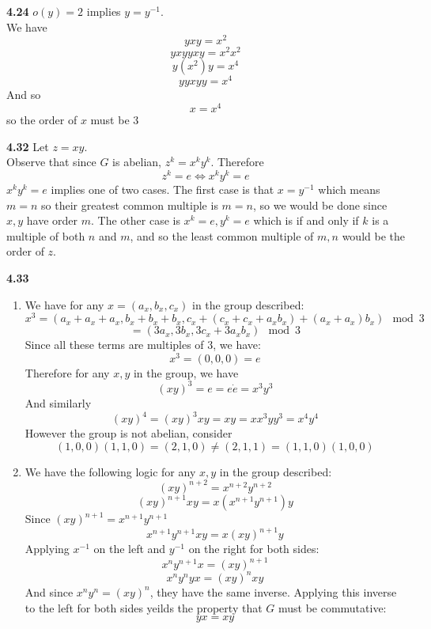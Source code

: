 \documentclass[12pt]{article}
\newenvironment{ques}{\vspace{2 ex}}{\vspace{2 ex}}
\theoremstyle{definition}
\begin{document}
\begin{ques}
	\textbf{4.24}
		$o(y) = 2$ implies $y = y^{-1}$.\\
		We have 
		$$yxy = x^2$$
		$$yxyyxy = x^2 x^2$$
		$$y(x^2)y = x^4$$
		$$yyxyy = x^4$$
		And so 
		$$x = x^4$$
		so the order of $x$ must be $3$
\end{ques}

\begin{ques}
	\textbf{4.32}
		Let $z = xy$.\\
		Observe that since $G$ is abelian, $z^k = x^ky^k$. Therefore
		$$z^k = e \Leftrightarrow x^ky^k = e$$ $x^ky^k = e$ implies one
		of two cases. The first case is that $x = y^{-1}$ which means
		$m = n$ so their greatest common multiple is $m = n$, so we
		would be done since $x,y$ have order $m$. The other case is
		$x^k = e, y^k = e$ which is if and only if $k$ is a multiple of
		both $n$ and $m$, and so the least common multiple of $m,n$
		would be the order of $z$.
\end{ques}

\begin{ques}
	\textbf{4.33}
		\begin{enumerate}
			\item We have for any $x = (a_x, b_x, c_x)$ in the group described:
				$$x^3 = (a_x + a_x + a_x, b_x + b_x + b_x, c_x
				+ (c_x +c_x + a_xb_x) + (a_x + a_x)b_x) \mod 3$$
				$$= (3a_x, 3b_x, 3c_x + 3a_xb_x) \mod 3$$
				Since all these terms are multiples of $3$, we have:
				$$x^3 = (0,0,0) = e$$
				Therefore for any $x,y$ in the group, we have
				$$(xy)^3 = e = e \dot e = x^3y^3$$
				And similarly 
				$$(xy)^4 = (xy)^3xy = xy = xx^3yy^3 = x^4y^4$$
				However the group is not abelian, consider
				$$(1, 0, 0)(1, 1, 0) = (2, 1, 0) \neq (2,1,1) =
				(1,1,0)(1,0,0)$$

			\item We have the following logic for any $x,y$ in the
				group described:
				$$(xy)^{n+2} = x^{n+2}y^{n+2}$$
				$$(xy)^{n+1}xy = x(x^{n+1}y^{n+1})y$$
				Since $(xy)^{n+1} = x^{n+1}y^{n+1}$
				$$x^{n+1}y^{n+1}xy = x(xy)^{n+1}y$$
				Applying $x^{-1}$ on the left and $y^{-1}$ on
				the right for both sides:
				$$x^ny^{n+1}x = (xy)^{n+1}$$
				$$x^ny^nyx = (xy)^nxy$$
				And since $x^ny^n = (xy)^n$, they have the same
				inverse. Applying this inverse to the left for
				both sides yeilds the property that $G$ must be
				commutative:
				$$yx = xy$$
		\end{enumerate}
\end{ques}
\end{document}
